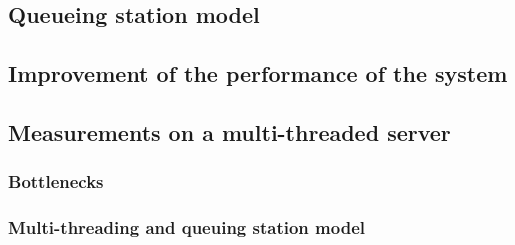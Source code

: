 \subsection{Queueing station model}
\label{sub:Queueing station model}

\subsection{Improvement of the performance of the system}
\label{sub:Improvement of the performance of the system}

\subsection{Measurements on a multi-threaded server}
\label{sub:Measurements on a multi-threaded server}

\subsubsection{Bottlenecks}
\label{subs:Bottlenecks}


\subsubsection{Multi-threading and queuing station model}
\label{subs:Multi-threading and queuing station model}

